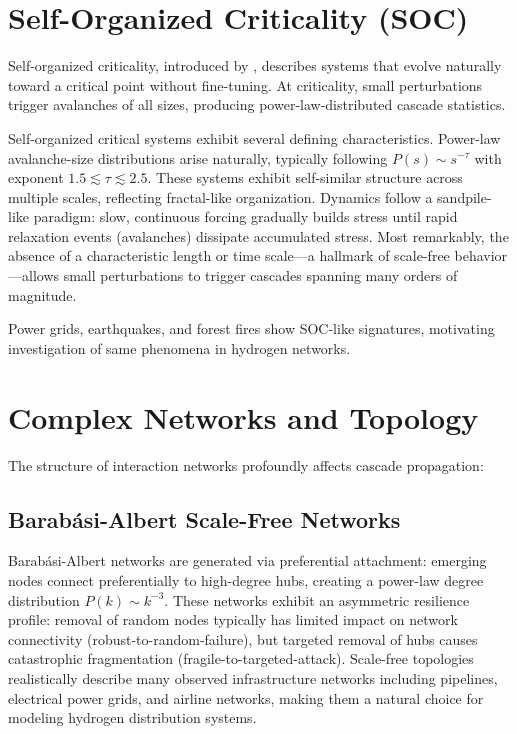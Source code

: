 \documentclass[12pt,a4paper,twoside]{report}
\begin{document}
\section{Self-Organized Criticality (SOC)}

Self-organized criticality, introduced by \citet{bak1987}, describes systems that evolve naturally toward a critical point without fine-tuning. At criticality, small perturbations trigger avalanches of all sizes, producing power-law-distributed cascade statistics.

Self-organized critical systems exhibit several defining characteristics. Power-law avalanche-size distributions arise naturally, typically following $P(s) \sim s^{-\tau}$ with exponent $1.5 \lesssim \tau \lesssim 2.5$. These systems exhibit self-similar structure across multiple scales, reflecting fractal-like organization. Dynamics follow a sandpile-like paradigm: slow, continuous forcing gradually builds stress until rapid relaxation events (avalanches) dissipate accumulated stress. Most remarkably, the absence of a characteristic length or time scale---a hallmark of scale-free behavior---allows small perturbations to trigger cascades spanning many orders of magnitude.

Power grids, earthquakes, and forest fires show SOC-like signatures, motivating investigation of same phenomena in hydrogen networks.

\section{Complex Networks and Topology}

The structure of interaction networks profoundly affects cascade propagation:

\subsection{Barab\'asi-Albert Scale-Free Networks}

Barab\'asi-Albert networks are generated via preferential attachment: emerging nodes connect preferentially to high-degree hubs, creating a power-law degree distribution $P(k) \sim k^{-3}$. These networks exhibit an asymmetric resilience profile: removal of random nodes typically has limited impact on network connectivity (robust-to-random-failure), but targeted removal of hubs causes catastrophic fragmentation (fragile-to-targeted-attack). Scale-free topologies realistically describe many observed infrastructure networks including pipelines, electrical power grids, and airline networks, making them a natural choice for modeling hydrogen distribution systems.
\end{document}
